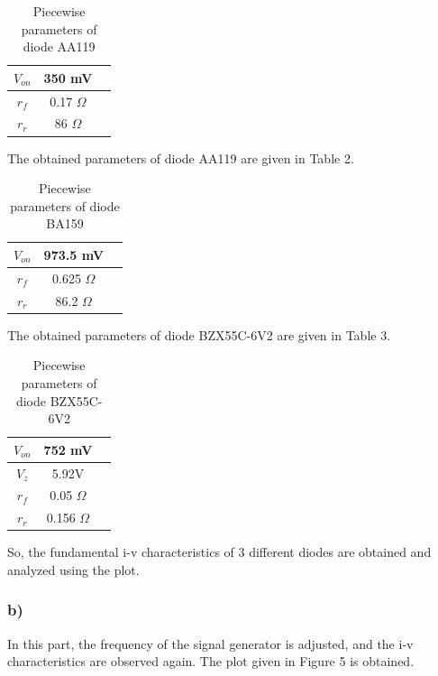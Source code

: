 \documentclass[letterpaper,12pt]{article}
\begin{document}
\begin{table}[H]
    \begin{center}
    \caption{Piecewise parameters of diode AA119}
    \vspace{2mm}
    \begin{tabular}{|| c | c | c ||}
    \hline
    \(V_{on}\) & 350 mV \\
    \hline 
    \(r_f\) & 0.17 \(\Omega\) \\
    \hline
    \(r_r\) & 86 \(\Omega\)\\
    \hline
    \end{tabular}
\end{center}
\end{table}
The obtained parameters of diode AA119 are given in Table 2.
\begin{table}[H]
    \centering
    \caption{Piecewise parameters of diode BA159}
    \vspace{2mm}
    \begin{tabular}{||c | c | c||}
    \hline
    \(V_{on}\) & 973.5 mV \\
    \hline
    \(r_f\) & 0.625 \(\Omega\) \\
    \hline
    \(r_r\) & 86.2 \(\Omega\)\\
    \hline
    \end{tabular}
\end{table}
The obtained parameters of diode BZX55C-6V2 are given in Table 3.
\begin{table}[H]
    \centering
    \caption{Piecewise parameters of diode BZX55C-6V2}
    \vspace{2mm}
    \begin{tabular}{||c | c | c||}
        \hline
    \(V_{on}\) & 752 mV \\
    \hline
    \(V_{z}\) & 5.92V \\
    \hline
    \(r_f\) & 0.05 \(\Omega\) \\
    \hline
    \(r_r\) & 0.156 \(\Omega\) \\
    \hline
    \end{tabular}
\end{table}
So, the fundamental i-v characteristics of 3 different diodes are obtained and analyzed using the plot.

\subsubsection{b)}
In this part, the frequency of the signal generator is adjusted, and the i-v characteristics are observed again. The plot given in Figure 5 is obtained.
\end{document}
